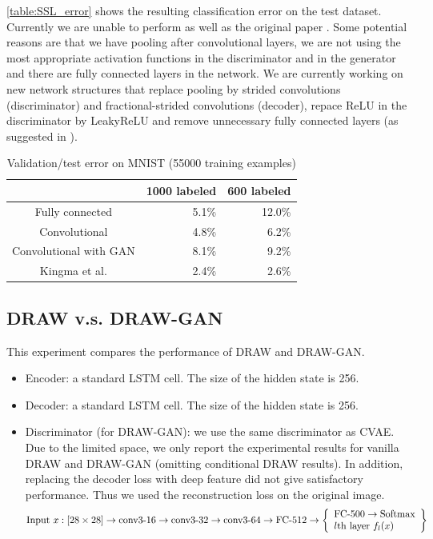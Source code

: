 \documentclass[10pt]{article}
\begin{document}
  \autoref{table:SSL_error} shows the resulting classification error on the test dataset. Currently we are unable to perform as well as the original paper \cite{DBLP:journals/corr/KingmaRMW14}. Some potential reasons are that we have pooling after convolutional layers, we are not using the most appropriate activation functions in the discriminator and in the generator and there are fully connected layers in the network. We are currently working on new network structures that replace pooling by strided convolutions (discriminator) and fractional-strided convolutions (decoder), repace ReLU in the discriminator by LeakyReLU and remove unnecessary fully connected layers (as suggested in \cite{alec2016dcgan}).

\begin{table}[!ht]
\centering
\begin{tabular}{c|r|r}
& 1000 labeled & 600 labeled\\ \hline
Fully connected &  5.1\% &  12.0\%\\
Convolutional &  4.8\% &  6.2\%\\
Convolutional with GAN &  8.1\% &  9.2\%\\
Kingma et al. \cite{DBLP:journals/corr/KingmaRMW14}
& 2.4\% & 2.6\%
\end{tabular}
\caption{Validation/test error on MNIST (55000 training examples)}
\label{table:SSL_error}
\end{table}




\subsection{DRAW v.s. DRAW-GAN}
This experiment compares the performance of DRAW and DRAW-GAN.



\begin{itemize}

\item Encoder: a standard LSTM cell. The size of the hidden state is 256.

\item Decoder: a standard LSTM cell. The size of the hidden state is 256.


\item Discriminator (for DRAW-GAN): we use the same discriminator as CVAE. Due to the limited space, we only report the experimental results for vanilla DRAW and DRAW-GAN (omitting conditional DRAW results). In addition, replacing the decoder loss with deep feature did not give satisfactory performance. Thus we used the reconstruction loss on the original image.
\[
\text{Input } x: [28\times 28] \to \text{conv3-16} \to \text{conv3-32} \to \text{conv3-64} \\
\to \text{FC-512} \to \left\{\begin{array}{lr}
        \text{FC-500}\to \text{Softmax}\\
        \text{$l$th layer $f_l(x)$}
        \end{array}\right\}
\]
\end{itemize}
\end{document}
